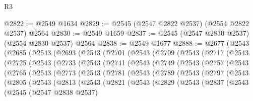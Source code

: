\begin{lexlean}{R3}
\begin{coremodule}
@2822 := @2549 @1634
@2829 := @2545 (@2547 @2822 @2537) (@2554 @2822 @2537) @2564
@2830 := @2549 @1659
@2837 := @2545 (@2547 @2830 @2537) (@2554 @2830 @2537) @2564
@2838 := @2549 @1677
@2888 := @2677
    (@2543
      (@2685
        (@2543
          (@2693
            (@2543
              (@2701
                (@2543
                  (@2709
                    (@2543
                      (@2717
                        (@2543
                          (@2725
                            (@2543
                              (@2733
                                (@2543
                                  (@2741
                                    (@2543
                                      (@2749
                                        (@2543
                                          (@2757
                                            (@2543
                                              (@2765
                                                (@2543
                                                  (@2773
                                                    (@2543
                                                      (@2781
                                                        (@2543
                                                          (@2789
                                                            (@2543
                                                              (@2797
                                                                (@2543
                                                                  (@2805
                                                                    (@2543
                                                                      (@2813
                                                                        (@2543
                                                                          (@2821
                                                                            (@2543
                                                                              (@2829
                                                                                (@2543
                                                                                  (@2837
                                                                                    (@2543
                                                                                      (@2545
                                                                                        (@2547
                                                                                          @2838
                                                                                          @2537)

\end{coremodule}
\end{lexlean}
